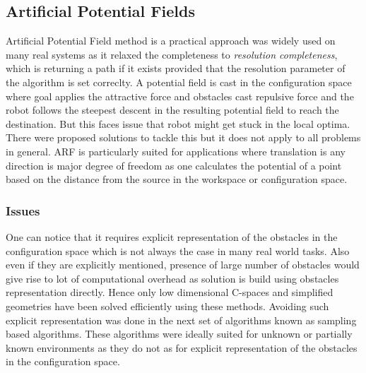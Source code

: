 \documentclass[MTech]{iitmdiss}
\begin{document}
\subsection{Artificial Potential Fields}
Artificial Potential Field method is a practical approach \cite{gecui02}
 was widely used on many real systems as it relaxed the completeness to \emph{resolution completeness}, which is returning a path if it exists provided that the resolution parameter of the algorithm is set correclty. A potential field is cast in the configuration space where goal applies the attractive force and obstacles cast repulsive force and the robot follows the steepest descent in the resulting potential field to reach the destination. But this faces issue that robot might get stuck in the local optima. There were proposed solutions \cite{barra91} to tackle this  but it does not apply to all problems in general. ARF is particularly suited for applications where translation is any direction is major degree of freedom as one calculates the potential of a point based on the distance from the source in the workspace or configuration space. 
\subsubsection{Issues}
 One can notice that it requires explicit representation of the obstacles in the configuration space which is not always the case in many real world tasks. Also even if they are explicitly mentioned, presence of large number of obstacles would give rise to lot of computational overhead as solution is build using obstacles representation directly. Hence only low dimensional C-spaces and simplified geometries have been solved efficiently using these methods. Avoiding such explicit representation was done in the next set of algorithms known as sampling based algorithms. These algorithms were ideally suited for unknown or partially known environments as they do not as for explicit representation of the obstacles in the configuration space.
 
\end{document}
